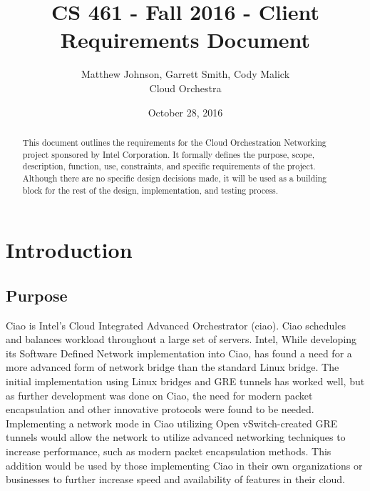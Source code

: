 \documentclass[10pt,letterpaper,onecolumn,draftclsnofoot]{IEEEtran}
\begin{document}
\begin{titlepage}
	\title{CS 461 - Fall 2016 - Client Requirements Document}
	\author{Matthew Johnson, Garrett Smith, Cody Malick\\Cloud Orchestra}
	\date{October 28, 2016}
	\maketitle
	\vspace{4cm}
	\begin{abstract}
		\noindent This document outlines the requirements for the Cloud Orchestration
		Networking project sponsored by Intel Corporation. It formally defines the
		purpose, scope, description, function, use, constraints, and specific
		requirements of the project. Although there are no specific design decisions
		made, it will be used as a building block for the rest of the design,
		implementation, and testing process.

	\end{abstract}

\end{titlepage}
\tableofcontents
\clearpage

\section{Introduction}

\subsection{Purpose}

Ciao is Intel's Cloud Integrated Advanced Orchestrator (ciao). Ciao schedules and balances workload
throughout a large set of servers. Intel, While developing its Software Defined Network implementation
into Ciao, has found a need for a more advanced form of network bridge than the standard Linux bridge.
The initial implementation using Linux bridges and GRE tunnels has worked well, but as further
development was done on Ciao, the need for modern packet encapsulation and other innovative protocols
were found to be needed. Implementing a network mode in Ciao utilizing Open vSwitch-created GRE
tunnels would allow the network to utilize advanced networking techniques to increase performance,
such as modern packet encapsulation methods. This addition would be used by those implementing Ciao in
their own organizations or businesses to further increase speed and availability of features in
their cloud.
\end{document}
